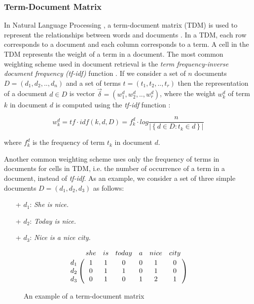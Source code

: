 \subsubsection{Term-Document Matrix}
 In Natural Language Processing \cite{Collobert:2011:NLP:1953048.2078186}, a term-document matrix (TDM) is used to represent the relationships between words and documents \cite{Turney:2010:FMV:1861751.1861756}. In a TDM, each row corresponds to a document and each column corresponds to a term. A cell in the TDM represents the weight of a term in a document. The most common weighting scheme used in document retrieval is the \emph{term frequency-inverse document frequency (tf-idf)} function \cite{Reed:2006:TNT:1193211.1193734}. If we consider a set of $n$ documents $D=(d_{1},d_{2},..,d_{n})$ and a set of terms $t=(t_{1},t_{2},..,t_{r})$ then the representation of a document $d \in D $ is vector $\vec{\delta}=(w_{1}^{d},w_{2}^{d},..,w_{r}^{d})$, where the weight $w_{k}^{d}$ of term $k$ in document $d$ is computed using the {\em tf-idf} function \cite{Ramos1999}:

\begin{equation} \label{tfidf} %
w_{k}^{d} =tf\cdot idf(k,d,D)= f_{k}^{d}\cdot log\frac{n}{\left | \left \{ d\in D: t_{k} \in d \right \} \right |} 
\end{equation}

where $f_{k}^{d}$ is the frequency of term $t_{k}$ in document $d$.

Another common weighting scheme uses only the frequency of terms in documents for cells in TDM, i.e. the number of occurrence of a term in a document, instead of {\em tf-idf}. As an example, we consider a set of three simple documents $D=(d_{1},d_{2},d_{3})$ as follows:

\begin{itemize}
	\item[+] $d_{1}$: \emph{She is nice.}
	\item[+] $d_{2}$: \emph{Today is nice.}
	\item[+] $d_{3}$: \emph{Nice is a nice city.}
\end{itemize}

\begin{figure}[h!]
	\begin{equation} \nonumber
	\bordermatrix{~ & she & is & today & a & nice & city \cr	
		d_{1} 		& 1 & 1 & 0 & 0 & 1 & 0 \cr 
		d_{2} 		& 0 & 1 & 1 & 0 & 1 & 0 \cr  
		d_{3} 		& 0 & 1 & 0 & 1 & 2 & 1 \cr }
	\end{equation}
	\caption{An example of a term-document matrix}
	\label{fig:TDM}
\end{figure}

